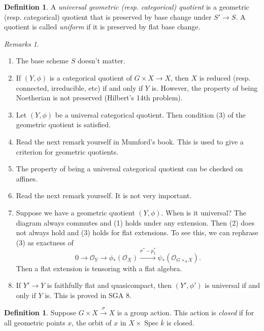 \documentclass[leqno, openany]{memoir}
\theoremstyle{definition}
\newtheorem{defn}[thm]{Definition}
\theoremstyle{remark}
\newtheorem{rmks}[thm]{Remarks}
\theoremstyle{plain}
\theoremstyle{definition}
\theoremstyle{remark}
\newcommand{\mc}[1]{\mathcal{#1}}
\newcommand{\ol}[1]{\overline{#1}}
\DeclareMathOperator{\Spec}{Spec}
\begin{document}
\begin{defn}
    A \textit{universal geometric (resp. categorical) quotient} is a geometric (resp. categorical) quotient that is preserved by base change under $S' \to S$. A quotient is called \textit{uniform} if it is preserved by flat base change. 
\end{defn}

\begin{rmks}
    \begin{enumerate}
        \item The base scheme $S$ doesn't matter.
        \item If $(Y, \phi)$ is a categorical quotient of $G \times X \to X$, then $X$ is reduced (resp. connected, irreducible, etc) if and only if $Y$ is. However, the property of being Noetherian is not preserved (Hilbert's 14th problem).
        \item Let $(Y, \phi)$ be a universal categorical quotient. Then condition (3) of the geometric quotient is satisfied.
        \item Read the next remark yourself in Mumford's book. This is used to give a criterion for geometric quotients.
        \item The property of being a universal categorical quotient can be checked on affines.
        \item Read the next remark yourself. It is not very important.
        \item Suppose we have a geometric quotient $(Y, \phi)$. When is it universal? The diagram always commutes and (1) holds under any extension. Then (2) does not always hold and (3) holds for flat extensions. To see this, we can rephrase (3) as exactness of
            \[ 0 \to \mc{O}_Y \to \phi_*(\mc{O}_X) \xrightarrow{\sigma^* - p_2^*} \psi_*(\mc{O}_{G \times_S X}). \]
            Then a flat extension is tensoring with a flat algebra.
        \item If $Y' \to Y$ is faithfully flat and quasicompact, then $(Y', \phi')$ is universal if and only if $Y$ is. This is proved in SGA 8.
    \end{enumerate}
\end{rmks}

\begin{defn}
    Suppose $G \times X \xrightarrow{\sigma} X$ is a group action. This action is \textit{closed} if for all geometric points $x$, the orbit of $x$ in $X \times \Spec \ol{k}$ is closed. 
\end{defn}
\end{document}
